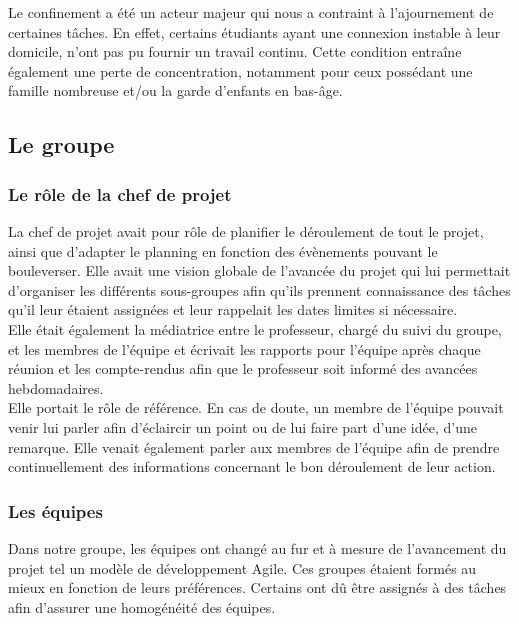 \documentclass[a4paper,11pt]{article}
\begin{document}
Le confinement a été un acteur majeur qui nous a contraint à l’ajournement de certaines tâches. En effet, certains étudiants ayant une connexion instable à leur domicile, n’ont pas pu fournir un travail continu. Cette condition entraîne également une perte de concentration, notamment pour ceux possédant une famille nombreuse et/ou la garde d’enfants en bas-âge.


\subsection{Le groupe}

\subsubsection{Le rôle de la chef de projet}

La chef de projet avait pour rôle de planifier le déroulement de tout le projet, ainsi que d'adapter le planning en fonction des évènements pouvant le bouleverser. Elle avait une vision globale de l’avancée du projet qui lui permettait d’organiser les différents sous-groupes afin qu’ils prennent connaissance des tâches qu’il leur étaient assignées et  leur rappelait les dates limites si nécessaire. \\

Elle était également la médiatrice entre le professeur, chargé du suivi du groupe, et les membres de l’équipe et écrivait les rapports pour l’équipe après chaque réunion et les compte-rendus afin que le professeur soit informé des avancées hebdomadaires. \\
	
Elle portait le rôle de référence. En cas de doute, un membre de l’équipe pouvait venir lui parler afin d’éclaircir un point ou de lui faire part d’une idée, d’une remarque. Elle venait également parler aux membres de l’équipe afin de prendre continuellement des informations concernant le bon déroulement de leur action.

\subsubsection{Les équipes}


Dans notre groupe, les équipes ont changé au fur et à mesure de l’avancement du projet tel un modèle de développement Agile. Ces groupes étaient formés au mieux en fonction de leurs préférences. Certains ont dû être assignés à des tâches afin d’assurer une homogénéité des équipes. \\
\end{document}
